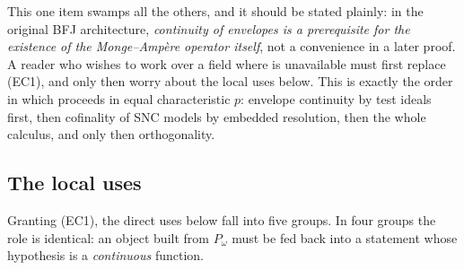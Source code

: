 This one item swamps all the others, and it should be stated plainly: in the
original BFJ architecture, \emph{continuity of envelopes is a prerequisite
for the existence of the Monge--Amp\`ere operator itself}, not a convenience
in a later proof.  A reader who wishes to work over a field where
 is unavailable must first replace
\textup{(EC1)}, and only then worry about the local uses below.  This is
exactly the order in which
 proceeds in equal characteristic
$p$: envelope continuity by test ideals first, then cofinality of SNC
models by embedded resolution, then the whole calculus, and only then
orthogonality.

\subsection{The local uses}
\label{sec:ch27-local-uses}

Granting \textup{(EC1)}, the direct uses below fall into five groups.
In four groups the role is identical: an
object built from $P_\omega$ must be fed back into a statement whose
hypothesis is a \emph{continuous} function.

